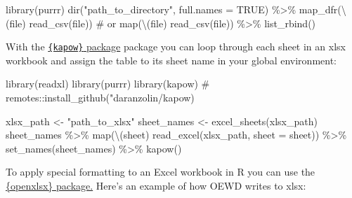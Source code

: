 \documentclass[
  letterpaper,
  DIV=11,
  numbers=noendperiod]{scrreprt}
\newenvironment{Shaded}{\begin{snugshade}}{\end{snugshade}}
\newcommand{\AttributeTok}[1]{\textcolor[rgb]{0.40,0.45,0.13}{#1}}
\newcommand{\CommentTok}[1]{\textcolor[rgb]{0.37,0.37,0.37}{#1}}
\newcommand{\ConstantTok}[1]{\textcolor[rgb]{0.56,0.35,0.01}{#1}}
\newcommand{\FunctionTok}[1]{\textcolor[rgb]{0.28,0.35,0.67}{#1}}
\newcommand{\NormalTok}[1]{\textcolor[rgb]{0.00,0.23,0.31}{#1}}
\newcommand{\OtherTok}[1]{\textcolor[rgb]{0.00,0.23,0.31}{#1}}
\newcommand{\SpecialCharTok}[1]{\textcolor[rgb]{0.37,0.37,0.37}{#1}}
\newcommand{\StringTok}[1]{\textcolor[rgb]{0.13,0.47,0.30}{#1}}
\begin{document}
\begin{Shaded}
\begin{Highlighting}[]
\FunctionTok{library}\NormalTok{(purrr)}
\FunctionTok{dir}\NormalTok{(}\StringTok{"path\_to\_directory"}\NormalTok{, }\AttributeTok{full.names =} \ConstantTok{TRUE}\NormalTok{) }\SpecialCharTok{\%\textgreater{}\%} 
  \FunctionTok{map\_dfr}\NormalTok{(\textbackslash{}(file) }\FunctionTok{read\_csv}\NormalTok{(file)) }\CommentTok{\# or map(\textbackslash{}(file) read\_csv(file)) \%\textgreater{}\% list\_rbind()}
\end{Highlighting}
\end{Shaded}

With the \href{https://github.com/daranzolin/kapow}{\texttt{\{kapow\}}
package} package you can loop through each sheet in an xlsx workbook and
assign the table to its sheet name in your global environment:

\begin{Shaded}
\begin{Highlighting}[]
\FunctionTok{library}\NormalTok{(readxl)}
\FunctionTok{library}\NormalTok{(purrr)}
\FunctionTok{library}\NormalTok{(kapow) }\CommentTok{\# remotes::install\_github("daranzolin/kapow)}

\NormalTok{xlsx\_path }\OtherTok{\textless{}{-}} \StringTok{"path\_to\_xlsx"}
\NormalTok{sheet\_names }\OtherTok{\textless{}{-}} \FunctionTok{excel\_sheets}\NormalTok{(xlsx\_path)}
\NormalTok{sheet\_names }\SpecialCharTok{\%\textgreater{}\%} 
  \FunctionTok{map}\NormalTok{(\textbackslash{}(sheet) }\FunctionTok{read\_excel}\NormalTok{(xlsx\_path, }\AttributeTok{sheet =}\NormalTok{ sheet)) }\SpecialCharTok{\%\textgreater{}\%} 
  \FunctionTok{set\_names}\NormalTok{(sheet\_names) }\SpecialCharTok{\%\textgreater{}\%} 
  \FunctionTok{kapow}\NormalTok{()}
\end{Highlighting}
\end{Shaded}

To apply special formatting to an Excel workbook in R you can use the
\href{https://github.com/ycphs/openxlsx}{\{openxlsx\} package.} Here's
an example of how OEWD writes to xlsx:
\end{document}

